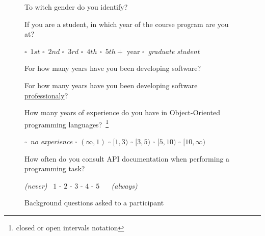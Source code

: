 \begin{figure}
\begin{mdframed}[backgroundcolor=gray!15] 
\begin{scriptsize}

\noindent To witch gender do you identify? 

\medskip

\noindent If you are a student, in which year of the course program are you at?  \smallskip

\quad $\square$~$1st$  
\quad $\square$~$2nd$  
\quad $\square$~$3rd$  
\quad $\square$~$4th$  
\quad $\square$~$5th+$ year 
\quad $\square$~\textit{graduate student} 

\medskip

\noindent For how many years have you been developing software?  

\medskip

\noindent For how many years have you been developing software \underline{professionaly}? 

\medskip

\noindent How many years of experience do you have in Object-Oriented programming languages?~\footnote{\scriptsize closed or open intervals notation} \smallskip

\quad $\square$~\textit{no experience} 
\quad $\square$ $(\infty, 1)$
\quad $\square$ $[1, 3)$
\quad $\square$ $[3, 5)$
\quad $\square$ $[5, 10)$
\quad $\square$ $[10, \infty)$

\medskip

\noindent How often do you consult API documentation when performing a programming task?  \smallskip

\quad \textit{(never)} ~$1$ - $2$ - $3$ - $4$ - $5$ ~ ~\textit{(always)} 

\end{scriptsize}
\end{mdframed}
\caption{Background questions asked to a participant}
\label{fig:experiment-demographics}
\end{figure}

    
